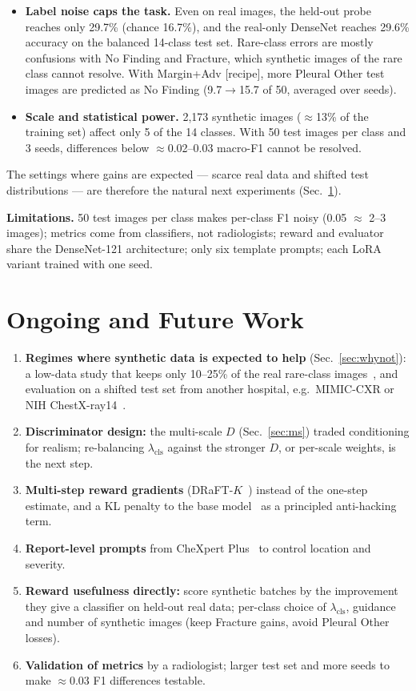 \documentclass[twoside,english]{article}
\begin{document}
\begin{itemize}
\item \textbf{Label noise caps the task.} Even on real images, the held-out probe reaches only 29.7\% (chance 16.7\%), and the real-only DenseNet reaches 29.6\% accuracy on the balanced 14-class test set. Rare-class errors are mostly confusions with No Finding and Fracture, which synthetic images of the rare class cannot resolve. With Margin+Adv [recipe], more Pleural Other test images are predicted as No Finding (9.7$\to$15.7 of 50, averaged over seeds).
\item \textbf{Scale and statistical power.} 2{,}173 synthetic images ($\approx$13\% of the training set) affect only 5 of the 14 classes. With 50 test images per class and 3 seeds, differences below $\approx$0.02--0.03 macro-F1 cannot be resolved.
\end{itemize}
The settings where gains are expected --- scarce real data and shifted test distributions --- are therefore the natural next experiments (Sec.~\ref{sec:Plan for Novelty Assessment}).

\textbf{Limitations.} 50 test images per class makes per-class F1 noisy (0.05 $\approx$ 2--3 images); metrics come from classifiers, not radiologists; reward and evaluator share the DenseNet-121 architecture; only six template prompts; each LoRA variant trained with one seed.

\section{Ongoing and Future Work}\label{sec:Plan for Novelty Assessment}
\begin{enumerate}\setlength\itemsep{0pt}
\item \textbf{Regimes where synthetic data is expected to help} (Sec.~\ref{sec:whynot}): a low-data study that keeps only 10--25\% of the real rare-class images~\citep{prakash2025synthetic}, and evaluation on a shifted test set from another hospital, e.g.\ MIMIC-CXR or NIH ChestX-ray14~\citep{ktena2024fairness}.
\item \textbf{Discriminator design:} the multi-scale $D$ (Sec.~\ref{sec:ms}) traded conditioning for realism; re-balancing $\lambda_{\text{cls}}$ against the stronger $D$, or per-scale weights, is the next step.
\item \textbf{Multi-step reward gradients} (DRaFT-$K$~\citep{clark2024draft}) instead of the one-step estimate, and a KL penalty to the base model~\citep{fan2023dpok} as a principled anti-hacking term.
\item \textbf{Report-level prompts} from CheXpert Plus~\citep{chambon2024chexpertplus} to control location and severity.
\item \textbf{Reward usefulness directly:} score synthetic batches by the improvement they give a classifier on held-out real data; per-class choice of $\lambda_{\text{cls}}$, guidance and number of synthetic images (keep Fracture gains, avoid Pleural Other losses).
\item \textbf{Validation of metrics} by a radiologist; larger test set and more seeds to make $\approx0.03$ F1 differences testable.
\end{enumerate}
\end{document}
